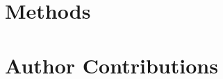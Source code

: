 \section{Methods}
\label{sec:asym-methods}

\section{Author Contributions}
\label{sec:asym-author-contributions}








